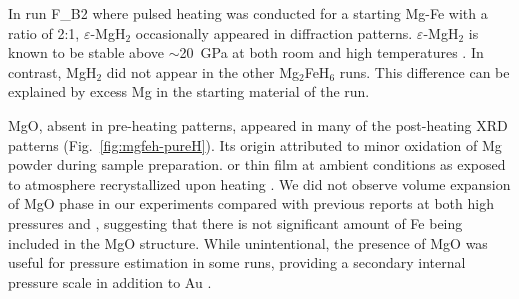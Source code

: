 \documentclass[draft,jgrga,12pt]{agujournal2019}
\begin{document}


In run F\_B2 where pulsed heating was conducted for a starting Mg-Fe with a ratio of 2:1, $\varepsilon$-MgH$_2$ occasionally appeared in diffraction patterns.   
$\varepsilon$-MgH$_2$ is known to be stable above $\sim$20~GPa at both room and high temperatures \cite{moriwaki_structural_2006}.  
In contrast, MgH$_2$ did not appear in the other Mg$_2$FeH$_6$ runs. 
This difference can be explained by excess Mg in the starting material of the run.




MgO, absent in pre-heating patterns, appeared in many of the post-heating XRD patterns (Fig.~\ref{fig:mgfeh-pureH}). 
Its origin  attributed to minor oxidation of Mg powder during sample preparation. 
 or {} thin film {} at ambient conditions as exposed to atmosphere  \cite{mahadeva_magnetism_2013, wang_turning_2018} 
{} recrystallized upon heating . 
We did not observe {} volume expansion of MgO phase in our experiments compared with previous reports \cite{ye_intercomparison_2017} at both high pressures and {}, suggesting that there is not significant amount of Fe being included in the MgO structure. 
While unintentional, the presence of MgO was useful for pressure estimation in some runs, providing a secondary internal pressure scale \cite{dorogokupets_equations_2007} in addition to Au \cite{fei_internally_2007}.
\end{document}
